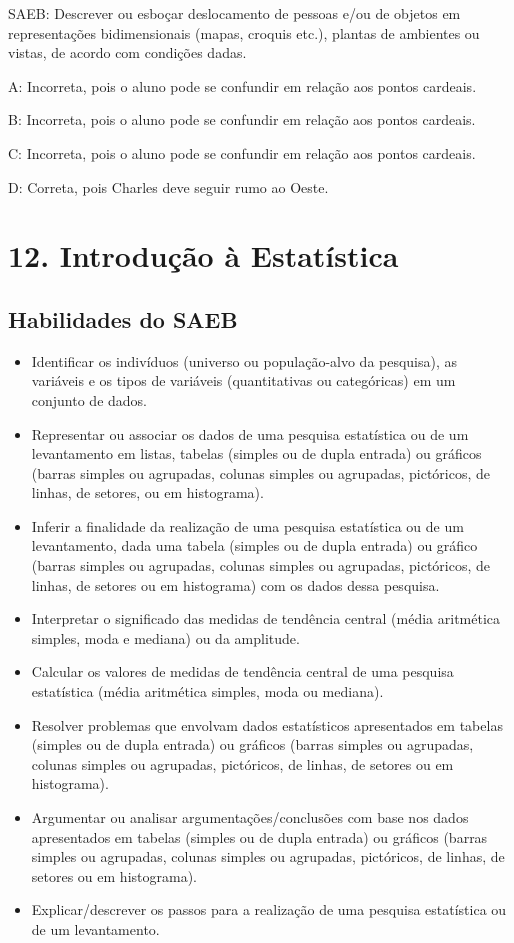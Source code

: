 {SAEB: Descrever ou esboçar deslocamento de pessoas e/ou de objetos em
representações bidimensionais (mapas, croquis etc.), plantas de
ambientes ou vistas, de acordo com condições dadas.

A: Incorreta, pois o aluno pode se confundir em relação aos pontos
cardeais.

B: Incorreta, pois o aluno pode se confundir em relação aos pontos
cardeais.

C: Incorreta, pois o aluno pode se confundir em relação aos pontos
cardeais.

D: Correta, pois Charles deve seguir rumo ao Oeste.


\chapter{12. Introdução à
Estatística}

\section{Habilidades do SAEB}

\begin{itemize}
\item Identificar os indivíduos (universo ou
população-alvo da pesquisa), as variáveis e os tipos de variáveis
(quantitativas ou categóricas) em um conjunto de dados.
\item
  Representar ou associar os dados de uma pesquisa estatística ou de um
  levantamento em listas, tabelas (simples ou de dupla entrada) ou
  gráficos (barras simples ou agrupadas, colunas simples ou agrupadas,
  pictóricos, de linhas, de setores, ou em histograma).
\item
  Inferir a finalidade da realização de uma pesquisa estatística ou de
  um levantamento, dada uma tabela (simples ou de dupla entrada) ou
  gráfico (barras simples ou agrupadas, colunas simples ou agrupadas,
  pictóricos, de linhas, de setores ou em histograma) com os dados dessa
  pesquisa.
\item
  Interpretar o significado das medidas de tendência central (média
  aritmética simples, moda e mediana) ou da amplitude.
\item
  Calcular os valores de medidas de tendência central de uma pesquisa
  estatística (média aritmética simples, moda ou mediana).
\item
  Resolver problemas que envolvam dados estatísticos apresentados em
  tabelas (simples ou de dupla entrada) ou gráficos (barras simples ou
  agrupadas, colunas simples ou agrupadas, pictóricos, de linhas, de
  setores ou em histograma).
\item
  Argumentar ou analisar argumentações/conclusões com base nos dados
  apresentados em tabelas (simples ou de dupla entrada) ou gráficos
  (barras simples ou agrupadas, colunas simples ou agrupadas,
  pictóricos, de linhas, de setores ou em histograma).
\item
  Explicar/descrever os passos para a realização de uma pesquisa
  estatística ou de um levantamento.
\end{itemize}

}

